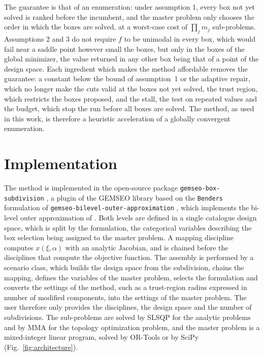 \documentclass[pdflatex,sn-basic]{sn-jnl}
\newcommand{\code}[1]{\texttt{\hyphenchar\font=45\relax #1}}
\begin{document}
The guarantee is that of an enumeration: under assumption 1, every box not yet
solved is ranked before the incumbent, and the master problem only chooses the
order in which the boxes are solved, at a worst-case cost of $\prod_j m_j$
sub-problems. Assumptions 2 and 3 do not require $f$ to be unimodal in every
box, which would fail near a saddle point however small the boxes, but only in
the boxes of the global minimizer, the value returned in any other box being
that of a point of the design space. Each ingredient which makes the method
affordable removes the guarantee: a constant below the bound of assumption~1 or
the adaptive repair, which no longer make the cuts valid at the boxes not yet
solved, the trust region, which restricts the boxes proposed, and the stall, the
test on repeated values and the budget, which stop the run before all boxes are
solved. The method, as used in this work, is therefore a heuristic acceleration
of a globally convergent enumeration.

\section{Implementation}\label{sec:implementation}

The method is implemented in the open-source package
\code{gemseo-box-subdivision} \citep{boxsubdivision}, a plugin of the GEMSEO
library \citep{gallard2018} based on the \code{Benders} formulation of
\code{gemseo-bilevel-outer-approximation} \citep{gemseobilevel}, which implements
the bi-level outer approximation of \citet{barjhoux2022}. Both levels are
defined in a single catalogue design space, which is split by the formulation,
the categorical variables describing the box selection being assigned to the
master problem. A mapping discipline computes $x(\xi,\alpha)$ with an analytic Jacobian, and is
chained
before the disciplines that compute the objective function. The assembly is
performed by a scenario class, which builds the design space from the
subdivision, chains the mapping, defines the variables of the master problem,
selects the formulation and converts the settings of the method, such as a
trust-region radius expressed in number of modified components, into the
settings of the master problem. The user therefore only provides the
disciplines, the design space and the number of subdivisions. The sub-problems
are solved by SLSQP \citep{kraft1988} for the analytic problems and by MMA
\citep{svanberg1987,gemseomma} for the topology optimization problem, and the master
problem is a mixed-integer linear program, solved by OR-Tools or by SciPy
(Fig.~\ref{fig:architecture}).
\end{document}
